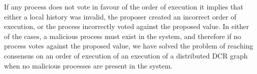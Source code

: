 	\newpar If any process does not vote in favour of the order of execution it implies that either a local history was invalid, the proposer created an incorrect order of execution, or the process incorrectly voted against the proposed value. In either of the cases, a malicious process must exist in the system, and therefore if no process votes against the proposed value, we have solved the problem of reaching consensus on an order of execution of an execution of a distributed DCR graph when no malicious processes are present in the system.